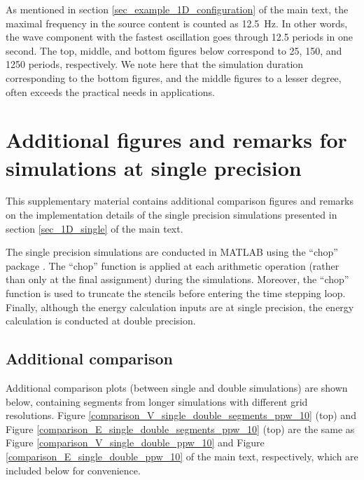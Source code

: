 As mentioned in section \ref{sec_example_1D_configuration} of the main text, the maximal frequency in the source content is counted as 12.5~Hz. 
%
In other words, the wave component with the fastest oscillation goes through 12.5 periods in one second. 
%
The top, middle, and bottom figures below correspond to 25, 150, and 1250 periods, respectively. 
%
We note here that the simulation duration corresponding to the bottom figures, and the middle figures to a lesser degree, often exceeds the practical needs in applications.





\newpage
\section{Additional figures and remarks for simulations at single precision}\label{SM_single_additional}
%
This supplementary material contains additional comparison figures and remarks on the implementation details of the single precision simulations presented in section \ref{sec_1D_single} of the main text.

The single precision simulations are conducted in MATLAB using the ``chop'' package \cite{higham2019simulating}.
% 
The ``chop'' function is applied at each arithmetic operation (rather than only at the final assignment) during the simulations.
%
Moreover, the ``chop'' function is used to truncate the stencils before entering the time stepping loop.
%
Finally, although the energy calculation inputs are at single precision, the energy calculation is conducted at double precision.


\subsection{Additional comparison}\label{SM_single_comparison}

Additional comparison plots (between single and double simulations) are shown below, containing segments from longer simulations with different grid resolutions.
%
Figure \ref{comparison_V_single_double_segments_ppw_10} (top) and Figure \ref{comparison_E_single_double_segments_ppw_10} (top) are the same as Figure \ref{comparison_V_single_double_ppw_10} and Figure \ref{comparison_E_single_double_ppw_10} of the main text, respectively, which are included below for convenience.

 



